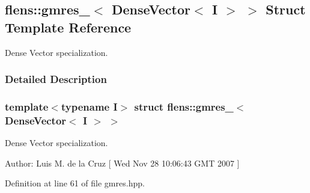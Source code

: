 \hypertarget{structflens_1_1gmres___3_01DenseVector_3_01I_01_4_01_4}{
\subsection{flens::gmres\_\-$<$ DenseVector$<$ I $>$ $>$ Struct Template Reference}
\label{structflens_1_1gmres___3_01DenseVector_3_01I_01_4_01_4}
}
Dense Vector specialization.  




\subsubsection{Detailed Description}
\subsubsection*{template$<$typename I$>$ struct flens::gmres\_\-$<$ DenseVector$<$ I $>$ $>$}

Dense Vector specialization. 

\begin{Desc}
\item[Author:]Luis M. de la Cruz \mbox{[} Wed Nov 28 10:06:43 GMT 2007 \mbox{]} \end{Desc}


Definition at line 61 of file gmres.hpp.